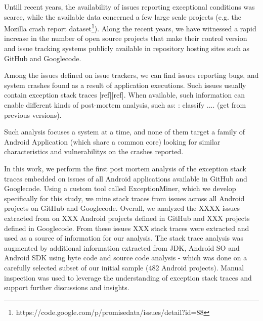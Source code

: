 \documentclass[conference]{IEEEtran}
\begin{document}
Untill recent years, the availability of issues reporting exceptional conditions was scarce, while the
available data concerned a few large scale projects (e.g. the Mozilla
crash report dataset\footnote{https://code.google.com/p/promisedata/issues/detail?id=88}).
Along the recent years, we have witnessed a rapid increase in the number of open
source projects that make their control version and issue tracking systems
publicly available in repository hosting sites such as GitHub and Googlecode.


Among the issues defined on issue trackers, we can find issues reporting bugs, and system crashes 
found as a result of application executions. Such issues usually contain exception stack traces [ref][ref]. 
When available, such information can enable different kinds of post-mortem analysis, such as:
: classify .... (get from previous versions).

Such analysis focuses a system at a time, and none of them target a family of Android Application
(which share a common core) looking for similar characteristics and vulnerabilitys on the crashes reported.

In this work, we perform the first post mortem analysis of the exception stack traces embedded on issues
of all Android applications available in GitHub and Googlecode. Using a custom tool called ExceptionMiner,
 which we develop specifically for this study, we mine stack traces from issues across all Android projects on
GitHub and Googlecode. Overall, we analyzed the XXXX issues extracted from on XXX Android projects defined in
GitHub and XXX projects defined in Googlecode. From these issues  XXX stack traces were extracted and used as
 a source of information for our analysis. The stack trace analysis was augmented by additional information
extracted from JDK, Android SO and Android SDK using byte code and source code analysis - which was done 
on a carefully selected subset of our initial sample (482 Android projects). Manual inspection was
used to leverage the understanding of exception stack traces and support further discussions and insights.

\end{document}
